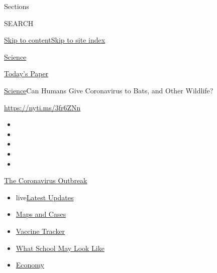 Sections

SEARCH

\protect\hyperlink{site-content}{Skip to
content}\protect\hyperlink{site-index}{Skip to site index}

\href{https://www.nytimes.com/section/science}{Science}

\href{https://myaccount.nytimes.com/auth/login?response_type=cookie\&client_id=vi}{}

\href{https://www.nytimes.com/section/todayspaper}{Today's Paper}

\href{/section/science}{Science}\textbar{}Can Humans Give Coronavirus to
Bats, and Other Wildlife?

\url{https://nyti.ms/3fr6ZNn}

\begin{itemize}
\item
\item
\item
\item
\item
\end{itemize}

\href{https://www.nytimes.com/news-event/coronavirus?action=click\&pgtype=Article\&state=default\&region=TOP_BANNER\&context=storylines_menu}{The
Coronavirus Outbreak}

\begin{itemize}
\tightlist
\item
  live\href{https://www.nytimes.com/2020/08/01/world/coronavirus-covid-19.html?action=click\&pgtype=Article\&state=default\&region=TOP_BANNER\&context=storylines_menu}{Latest
  Updates}
\item
  \href{https://www.nytimes.com/interactive/2020/us/coronavirus-us-cases.html?action=click\&pgtype=Article\&state=default\&region=TOP_BANNER\&context=storylines_menu}{Maps
  and Cases}
\item
  \href{https://www.nytimes.com/interactive/2020/science/coronavirus-vaccine-tracker.html?action=click\&pgtype=Article\&state=default\&region=TOP_BANNER\&context=storylines_menu}{Vaccine
  Tracker}
\item
  \href{https://www.nytimes.com/interactive/2020/07/29/us/schools-reopening-coronavirus.html?action=click\&pgtype=Article\&state=default\&region=TOP_BANNER\&context=storylines_menu}{What
  School May Look Like}
\item
  \href{https://www.nytimes.com/live/2020/07/31/business/stock-market-today-coronavirus?action=click\&pgtype=Article\&state=default\&region=TOP_BANNER\&context=storylines_menu}{Economy}
\end{itemize}

